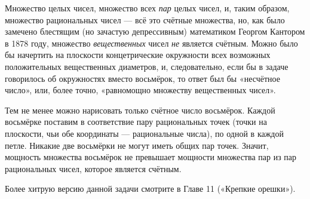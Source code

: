 \medskip

Множество целых чисел, множество всех \emph{пар} целых чисел, и, таким образом, множество рациональных чисел --- всё это счётные множества, но, как было замечено блестящим (но зачастую депрессивным) математиком Георгом Кантором в 1878 году, множество \emph{вещественных} чисел \emph{не} является счётным.
Можно было бы начертить на плоскости концетрические окружности всех возможных положительных вещественных диаметров, и, следовательно, если бы в задаче говорилось об окружностях вместо восьмёрок, то ответ был бы «несчётное число», или, более точно, «равномощно множеству вещественных чисел».

Тем не менее можно нарисовать только счётное число восьмёрок.
Каждой восьмёрке поставим в соответствие пару рациональных точек (точки на плоскости, чьи обе координаты --- рациональные числа), по одной в каждой петле.
Никакие две восьмёрки не могут иметь общих пар точек.
Значит, мощность множества восьмёрок не превышает мощности множества пар из пар рациональных чисел, которое является счётным.\heart

{

\sloppy

Более хитрую версию данной задачи смотрите в Главе 11 («Крепкие орешки»).

}
